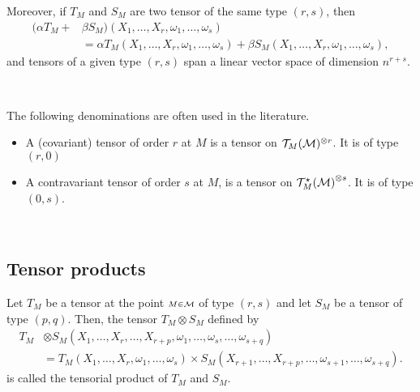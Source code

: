 \begin{definition}
Moreover, if $T_{\scriptscriptstyle M}$ and $S_{\scriptscriptstyle M}$ are two tensor of the same type $(r,s)$, then
\begin{equation}
\begin{aligned}
(\alpha T_{\scriptscriptstyle M}+ &\beta S_{\scriptscriptstyle M})(X_{1},\dots, X_{r},\omega_{1},\dots,\omega_{s})\\
&=\alpha T_{\scriptscriptstyle M}(X_{1},\dots, X_{r},\omega_{1},\dots,\omega_{s})+ \beta S_{\scriptscriptstyle M}(X_{1},\dots, X_{r},\omega_{1},\dots,\omega_{s} ), \end{aligned}\end{equation}
and tensors of a given type $(r,s)$ span a linear vector space of dimension $n^{r+s}$.
\end{definition}


\,

The following denominations are often used in the literature. 
\begin{itemize}
\item A (covariant) tensor of order $r$ at $\scriptstyle M$ is a tensor on $\mathcal{T}_{\scriptstyle M}(\mathcal{M})^{\otimes r}$. It is of type $(r,0)$\\
\item  A contravariant tensor of order $s$ at $\scriptstyle M$, is a tensor on ${\mathcal{T}^\star _{\scriptstyle M}(\mathcal{M})}^{\otimes s}$. It is of type $(0,s)$.
\end{itemize}

\,
\subsection{Tensor products}
\begin{definition}
Let $T_{\scriptscriptstyle M}$ be a tensor at the point $\scriptstyle M\in \mathcal{M}$ of type $(r,s)$ and let $S_{\scriptscriptstyle M}$ be a tensor of type $(p,q)$. Then, the tensor $T_{\scriptscriptstyle M}\otimes S_{\scriptscriptstyle M}$ defined by
\begin{equation}\begin{aligned}
T_{\scriptscriptstyle M}&\otimes S_{\scriptscriptstyle M}(X_{1},\dots,X_{r},\dots,X_{r+p},\omega_{1},\dots,\omega_{s},\dots,\omega_{s+q})\\
&=T_{\scriptscriptstyle M}(X_{1},\dots,X_{r},\omega_{1},\dots,\omega_{s})\times  S_{\scriptscriptstyle M}(X_{r+1},\dots,X_{r+p},\dots,\omega_{s+1},\dots,\omega_{s+q}).
\end{aligned}\end{equation}
is called the tensorial product of $T_{\scriptscriptstyle M}$ and $S_{\scriptscriptstyle M}$.
\end{definition}


